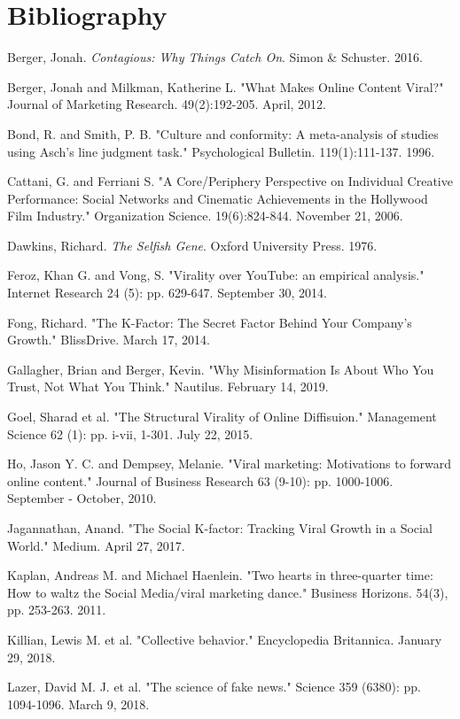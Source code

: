 \documentclass[class=book, crop=false]{standalone}
\begin{document}
\section{Bibliography}

Berger, Jonah. \textit{Contagious: Why Things Catch On}. Simon \& Schuster. 2016.

Berger, Jonah and Milkman, Katherine L. "What Makes Online Content Viral?" Journal of Marketing Research. 49(2):192-205. April, 2012.

Bond, R. and Smith, P. B. "Culture and conformity: A meta-analysis of studies using Asch's line judgment task." Psychological Bulletin. 119(1):111-137. 1996.

Cattani, G. and Ferriani S. "A Core/Periphery Perspective on Individual Creative Performance: Social Networks and Cinematic Achievements in the Hollywood Film Industry." Organization Science. 19(6):824-844. November 21, 2006.

Dawkins, Richard. \textit{The Selfish Gene}. Oxford University Press. 1976.

Feroz, Khan G. and Vong, S. "Virality over YouTube: an empirical analysis." Internet Research 24 (5): pp. 629-647. September 30, 2014.

Fong, Richard. "The K-Factor: The Secret Factor Behind Your Company's Growth." BlissDrive. March 17, 2014.

Gallagher, Brian and Berger, Kevin. "Why Misinformation Is About Who You Trust, Not What You Think." Nautilus. February 14, 2019.

Goel, Sharad et al. "The Structural Virality of Online Diffisuion." Management Science 62 (1): pp. i-vii, 1-301. July 22, 2015.

Ho, Jason Y. C. and Dempsey, Melanie. "Viral marketing: Motivations to forward online content." Journal of Business Research 63 (9-10): pp. 1000-1006. September - October, 2010.

Jagannathan, Anand. "The Social K-factor: Tracking Viral Growth in a Social World." Medium. April 27, 2017.

Kaplan, Andreas M. and Michael Haenlein. "Two hearts in three-quarter time: How to waltz the Social Media/viral marketing dance." Business Horizons. 54(3), pp. 253-263. 2011.

Killian, Lewis M. et al. "Collective behavior." Encyclopedia Britannica. January 29, 2018.

Lazer, David M. J. et al. "The science of fake news." Science 359 (6380): pp. 1094-1096. March 9, 2018.
\end{document}
